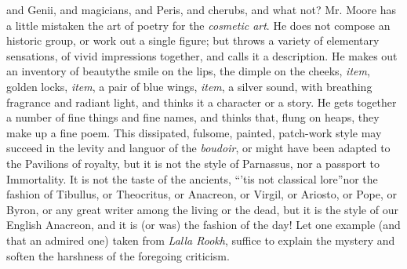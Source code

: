 and Genii, and magicians, and Peris, and cherubs, and what not?
Mr. Moore has a little mistaken the art of poetry for the
\emph{cosmetic art}. He does not compose an historic group, or
work out a single figure; but throws a variety of elementary
sensations, of vivid impressions together, and calls it a
description. He makes out an inventory of beauty\textemdash the
smile on the lips, the dimple on the cheeks, \emph{item}, golden
locks, \emph{item}, a pair of blue wings, \emph{item}, a silver
sound, with breathing fragrance and radiant light, and thinks it a
character or a story. He gets together a number of fine things and
fine names, and thinks that, flung on heaps, they make up a fine
poem. This dissipated, fulsome, painted, patch-work style may
succeed in the levity and languor of the \emph{boudoir}, or might
have been adapted to the Pavilions of royalty, but it is not the
style of Parnassus, nor a passport to Immortality. It is not the
taste of the ancients, ``'tis not classical lore''\textemdash nor
the fashion of Tibullus, or Theocritus, or Anacreon, or Virgil, or
Ariosto, or Pope, or Byron, or any great writer among the living
or the dead, but it is the style of our English Anacreon, and it
is (or was) the fashion of the day! Let one example (and that an
admired one) taken from \emph{Lalla Rookh}, suffice to explain the
mystery and soften the harshness of the foregoing criticism.
